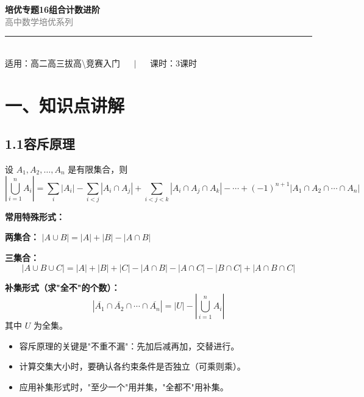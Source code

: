 \documentclass[12pt, a4paper]{ctexart}
\begin{document}
\begin{center}
{\Huge\bfseries\textcolor{mainblue}{培优专题16\quad 组合计数进阶}}\\[12pt]
{\Large\textcolor{gray}{高中数学培优系列}}\\[8pt]
\rule{0.6\textwidth}{1pt}\\[8pt]
{\normalsize 适用：高二高三拔高\textbackslash 竞赛入门 \(\quad\mid\quad\) 课时：3课时}
\end{center}
\vspace{10pt}

\section*{\textcolor{mainblue}{一、知识点讲解}}

\subsection*{1.1\quad 容斥原理}

\begin{knowledgebox}
设 \(A_1, A_2, \ldots, A_n\) 是有限集合，则
\[
\left|\bigcup_{i=1}^{n} A_i\right|
= \sum_{i} |A_i| - \sum_{i<j} |A_i \cap A_j| + \sum_{i<j<k} |A_i \cap A_j \cap A_k| - \cdots + (-1)^{n+1}|A_1 \cap A_2 \cap \cdots \cap A_n|
\]

\textbf{常用特殊形式：}

\textbf{两集合：} \(|A \cup B| = |A| + |B| - |A \cap B|\)

\textbf{三集合：}
\[
|A \cup B \cup C| = |A|+|B|+|C| - |A\cap B|-|A\cap C|-|B\cap C| + |A\cap B\cap C|
\]

\textbf{补集形式（求"全不"的个数）：}
\[
\left|\overline{A_1} \cap \overline{A_2} \cap \cdots \cap \overline{A_n}\right|
= |U| - \left|\bigcup_{i=1}^{n} A_i\right|
\]
其中 \(U\) 为全集。
\end{knowledgebox}

\begin{warnbox}[易错提醒]
\begin{itemize}[leftmargin=1.5em]
  \item 容斥原理的关键是"不重不漏"：先加后减再加，交替进行。
  \item 计算交集大小时，要确认各约束条件是否独立（可乘则乘）。
  \item 应用补集形式时，"至少一个"用并集，"全都不"用补集。
\end{itemize}
\end{warnbox}
\end{document}
